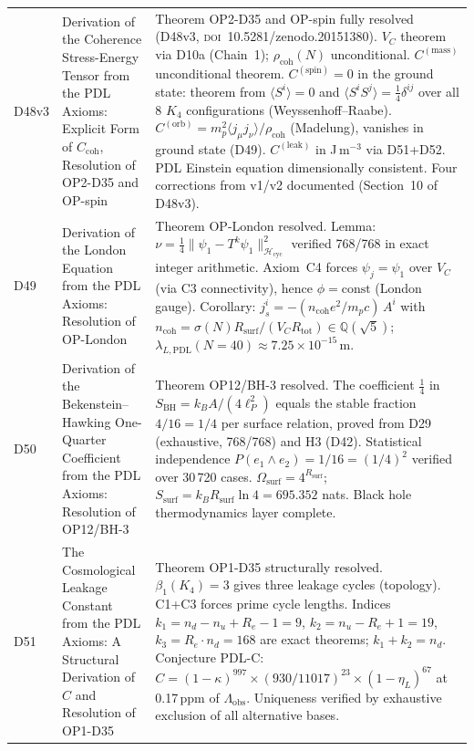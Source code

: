 \documentclass[11pt,a4paper]{article}
\theoremstyle{plain}
\theoremstyle{definition}
\theoremstyle{remark}
\newcommand{\Rsurf}{R_{\mathrm{surf}}}
\newcommand{\Rtot}{R_{\mathrm{tot}}}
\newcommand{\SBH}{S_{\mathrm{BH}}}
\newcommand{\rhocoh}{\rho_{\mathrm{coh}}}
\newcommand{\Ccoh}{C_{\mathrm{coh}}}
\begin{document}
\begin{longtable}{L{1.3cm}L{3.8cm}L{8.0cm}}
D48v3 & Derivation of the Coherence Stress-Energy Tensor from the PDL Axioms: Explicit Form of $\Ccoh$, Resolution of OP2-D35 and OP-spin~\cite{D48} & \textcolor{proofblue}{Theorem} OP2-D35 and OP-spin fully resolved (D48v3, \textsc{doi}~10.5281/zenodo.20151380). $V_C$ theorem via D10a (Chain~1); $\rhocoh(N)$ unconditional. $C^{(\mathrm{mass})}$ unconditional theorem. $C^{(\mathrm{spin})}=0$ in the ground state: theorem from $\langle S^i\rangle=0$ and $\langle S^iS^j\rangle=\tfrac{1}{4}\delta^{ij}$ over all 8 $K_4$ configurations (Weyssenhoff--Raabe). $C^{(\mathrm{orb})}=m_p^2\langle j_\mu j_\nu\rangle/\rhocoh$ (Madelung), vanishes in ground state (D49). $C^{(\mathrm{leak})}$ in J\,m$^{-3}$ via D51+D52. PDL Einstein equation dimensionally consistent. Four corrections from v1/v2 documented (Section~10 of D48v3).\\[0.4em]
D49 & Derivation of the London Equation from the PDL Axioms: Resolution of OP-London~\cite{D49} & \textcolor{proofblue}{Theorem} OP-London resolved. Lemma: $\nu = \tfrac{1}{4}\|\psi_1 - T^k\psi_1\|^2_{\mathcal{H}_{\mathrm{cyc}}}$ verified 768/768 in exact integer arithmetic. Axiom~C4 forces $\psi_j = \psi_1$ over $V_C$ (via C3 connectivity), hence $\phi = \mathrm{const}$ (London gauge). Corollary: $j^i_s = -(n_{\mathrm{coh}} e^2 / m_p c)\,A^i$ with $n_{\mathrm{coh}} = \sigma(N)\Rsurf/(V_C\Rtot) \in \mathbb{Q}(\sqrt{5})$; $\lambda_{L,\mathrm{PDL}}(N=40) \approx 7.25 \times 10^{-15}$\,m.\\[0.4em]
D50 & Derivation of the Bekenstein--Hawking One-Quarter Coefficient from the PDL Axioms: Resolution of OP12/BH-3~\cite{D50} & \textcolor{proofblue}{Theorem} OP12/BH-3 resolved. The coefficient $\tfrac{1}{4}$ in $\SBH = k_B A/(4\ell_P^2)$ equals the stable fraction $4/16 = 1/4$ per surface relation, proved from D29 (exhaustive, 768/768) and H3 (D42). Statistical independence $P(e_1\wedge e_2) = 1/16 = (1/4)^2$ verified over 30\,720 cases. $\Omega_{\mathrm{surf}} = 4^{\Rsurf}$; $S_{\mathrm{surf}} = k_B\Rsurf\ln 4 = 695.352$ nats. Black hole thermodynamics layer complete.\\[0.4em]
D51 & The Cosmological Leakage Constant from the PDL Axioms: A Structural Derivation of $C$ and Resolution of OP1-D35~\cite{D51} & \textcolor{proofblue}{Theorem} OP1-D35 structurally resolved. $\beta_1(K_4)=3$ gives three leakage cycles (topology). C1+C3 forces prime cycle lengths. Indices $k_1 = n_d - n_u + R_e - 1 = 9$, $k_2 = n_u - R_e + 1 = 19$, $k_3 = R_e \cdot n_d = 168$ are exact theorems; $k_1+k_2=n_d$. Conjecture PDL-C: $C = (1-\kappa)^{997} \times (930/11017)^{23} \times (1-\eta_L)^{67}$ at 0.17\,ppm of $\Lambda_{\mathrm{obs}}$. Uniqueness verified by exhaustive exclusion of all alternative bases.\\[0.4em]

\end{longtable}
\end{document}
